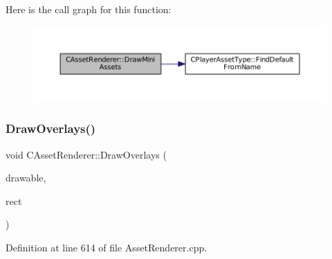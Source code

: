 Here is the call graph for this function\+:
\nopagebreak
\begin{figure}[H]
\begin{center}
\leavevmode
\includegraphics[width=350pt]{classCAssetRenderer_aeae64eefc83960997f372880140aaaa5_cgraph}
\end{center}
\end{figure}
\hypertarget{classCAssetRenderer_a1d2941f9b7aa116f578642c62410bb4a}{}\label{classCAssetRenderer_a1d2941f9b7aa116f578642c62410bb4a} 
\subsubsection{\texorpdfstring{Draw\+Overlays()}{DrawOverlays()}}
{\footnotesize\ttfamily void C\+Asset\+Renderer\+::\+Draw\+Overlays (\begin{DoxyParamCaption}\item[{Gdk\+Drawable $\ast$}]{drawable,  }\item[{const \hyperlink{structSRectangle}{S\+Rectangle} \&}]{rect }\end{DoxyParamCaption})}



Definition at line 614 of file Asset\+Renderer.\+cpp.


